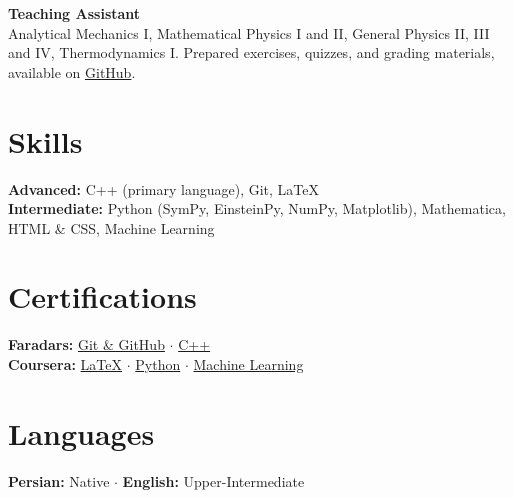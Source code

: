 \documentclass[11pt,a4paper]{article}
\begin{document}
	\textbf{Teaching Assistant} \\[0.2em]
	Analytical Mechanics I, Mathematical Physics I and II, General Physics II, III and IV, Thermodynamics I. Prepared exercises, quizzes, and grading materials, available on \href{https://github.com/AbolfazlMohammadi2005}{GitHub}.

	\section{Skills}

	\textbf{Advanced:} C++ (primary language), Git, LaTeX \\[0.3em]
	\textbf{Intermediate:} Python (SymPy, EinsteinPy, NumPy, Matplotlib), Mathematica, HTML \& CSS, Machine Learning

	\section{Certifications}

	\textbf{Faradars:} \href{https://faradars.org/verify/8A644022?lang=en}{Git \& GitHub} \quad $\cdot$ \quad
	\href{https://faradars.org/verify/B6A1C8AA?lang=en}{C++} \\[0.3em]
	\textbf{Coursera:} \href{https://www.coursera.org/account/accomplishments/records/SJ8X650LGR6X}{LaTeX} \quad $\cdot$ \quad
	\href{https://www.coursera.org/account/accomplishments/records/14T1QHM9IGJ9}{Python} \quad $\cdot$ \quad
	\href{https://www.coursera.org/account/accomplishments/records/Q2XLXFUVA3OK}{Machine Learning}

	\section{Languages}

	\textbf{Persian:} Native \quad $\cdot$ \quad \textbf{English:} Upper-Intermediate
\end{document}
